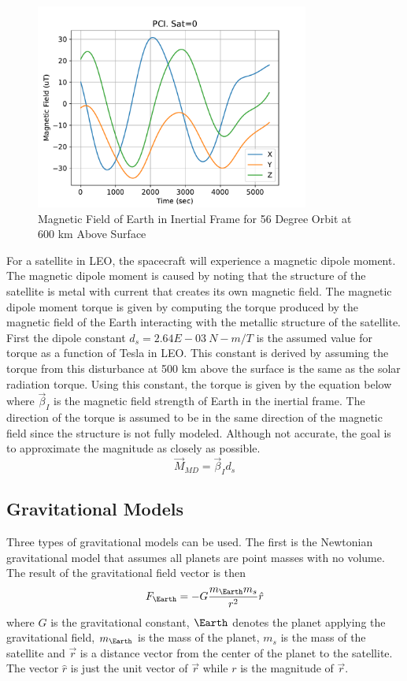 \documentclass{article}
\begin{document}
\begin{figure}[H]
  \begin{center}
  \includegraphics[width=90mm]{Figures/Magnetic_Field_Orbit}
  \end{center}
  \caption{Magnetic Field of Earth in Inertial Frame for 56 Degree
    Orbit at 600 km Above Surface}\label{f:mag_orbit}
\end{figure}
For a satellite in LEO, the spacecraft will experience a magnetic
dipole moment. The magnetic dipole moment is caused by noting that the
structure of the satellite is metal with current that creates its own
magnetic field. The magnetic dipole moment torque is given by
computing the torque produced by the magnetic field of the Earth
interacting with the metallic structure of the satellite. First the
dipole constant $d_s=2.64E-03~N-m/T$ is the assumed value for torque
as a function of Tesla in LEO. This constant is derived by assuming
the torque from this disturbance at 500 km above the surface is the
same as the solar radiation torque. Using this constant, the torque is
given by the equation below where $\vec{\beta}_I$ is the magnetic
field strength of Earth in the inertial frame. The direction of the
torque is assumed to be in the same direction of the magnetic field
since the structure is not fully modeled. Although not accurate, the
goal is to approximate the magnitude as closely as possible.  
\begin{equation}
    \vec{M}_{MD}=\vec{\beta}_I d_s
\end{equation}

\subsection{Gravitational Models}

Three types of gravitational models can be used. The first is the
Newtonian gravitational model that assumes all planets are point
masses with no volume. The result of the gravitational field vector is
then
\begin{equation}
  F_{\Earth} = -G\frac{m_{\Earth} m_s}{r^2}\hat{r}
\end{equation}
where $G$ is the gravitational constant, $\Earth$ denotes the planet
applying the gravitational field, $m_\Earth$ is the mass of the
planet, $m_s$ is the mass of the satellite and $\vec{r}$ is a distance
vector from the center of the planet to the satellite. The vector
$\hat{r}$ is just the unit vector of $\vec{r}$ while $r$ is the
magnitude of $\vec{r}$.
\end{document}
